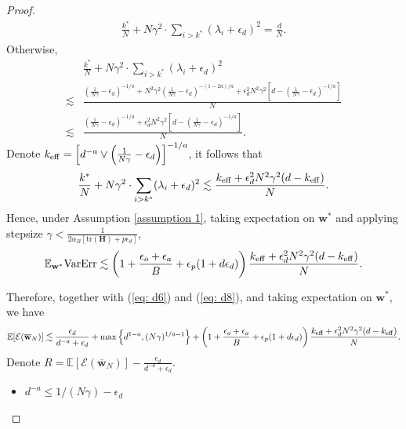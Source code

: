 \documentclass[11pt, letterpaper]{article}
\begin{document}
\begin{proof}
\begin{equation*}
\begin{aligned}
            \frac{k^*}{N}+N\gamma^2\cdot\sum_{i>k^*}(\lambda_i+\epsilon_d)^2=\frac{d}{N}.
        \end{aligned}
    \end{equation*}
    Otherwise,
    \begin{equation*}
        \begin{aligned}
            &\frac{k^*}{N}+N\gamma^2\cdot\sum_{i>k^*}(\lambda_i+\epsilon_d)^2\\
            \lesssim&\frac{\left(\frac{1}{N\gamma}-\epsilon_d\right)^{-1/a}+N^2\gamma^2\left(\frac{1}{N\gamma}-\epsilon_d\right)^{-(1-2a)/a}+\epsilon_d^2N^2\gamma^2\left[d-\left(\frac{1}{N\gamma}-\epsilon_d\right)^{-1/a}\right]}{N}\\
            \lesssim&\frac{\left(\frac{1}{N\gamma}-\epsilon_d\right)^{-1/a}+\epsilon_d^2N^2\gamma^2\left[d-\left(\frac{1}{N\gamma}-\epsilon_d\right)^{-1/a}\right]}{N}.
        \end{aligned}
    \end{equation*}
    Denote $k_{\rm eff}=\left[d^{-a}\vee \left(\frac{1}{N\gamma}-\epsilon_d\right)\right]^{-1/a}$, it follows that
    \begin{equation*}
        \frac{k^*}{N}+N\gamma^2\cdot\sum_{i>k^*}(\lambda_i+\epsilon_d)^2\lesssim\frac{k_{\rm eff}+\epsilon_d^2N^2\gamma^2(d-k_{\rm eff})}{N}.
    \end{equation*}
    Hence, under Assumption \ref{assumption 1}, taking expectation on $\mathbf{w}^*$ and applying stepsize $\gamma < \frac{1}{2 \alpha_B [\mathrm{tr}(\mathbf{H})+p\epsilon_d]}$,
    \begin{equation}
        \label{eq: d8}\mathbb{E}_{\mathbf{w}^*}\mathrm{VarErr}\lesssim \left(1+\frac{\epsilon_o+\epsilon_a}{B}+\epsilon_p(1+d\epsilon_d)\right)\frac{k_{\rm eff}+\epsilon_d^2N^2\gamma^2(d-k_{\rm eff})}{N}.
    \end{equation}
    
    Therefore, together with (\ref{eq: d6}) and (\ref{eq: d8}), and taking expectation on $\mathbf{w}^*$, we have
    \begin{equation*}
        \mathbb{E}[\mathcal{E}(\overline{\mathbf{w}}_N)]\lesssim  \frac{\epsilon_d}{d^{-a}+\epsilon_d}+\max\left\{d^{1-a},(N\gamma)^{1/a-1}\right\}+\left(1+\frac{\epsilon_o+\epsilon_a}{B}+\epsilon_p(1+d\epsilon_d)\right)\frac{k_{\rm eff}+\epsilon_d^2N^2\gamma^2(d-k_{\rm eff})}{N}.
    \end{equation*}
    Denote $R=\mathbb{E}[\mathcal{E}(\overline{\mathbf{w}}_N)]-  \frac{\epsilon_d}{d^{-a}+\epsilon_d}$.
    \begin{itemize}[leftmargin=*,nosep]
        \item $d^{-a}\leq {1}/{(N\gamma)}-\epsilon_d$


\end{itemize}
\end{proof}
\end{document}
